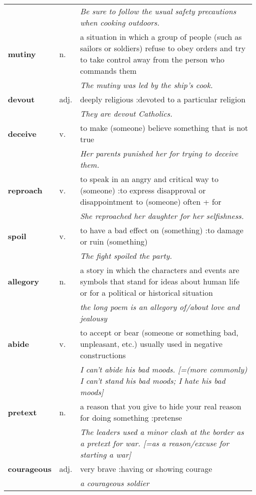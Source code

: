 \documentclass[a4paper]{article}
\begin{document}
\begin{longtable}{llp{11cm}}
 & & \textit{Be sure to follow the usual safety precautions when cooking outdoors.}\\[0.08cm]
\textbf{mutiny} & n. &  a situation in which a group of people (such as sailors or soldiers) refuse to obey orders and try to take control away from the person who commands them \\
 & & \textit{The mutiny was led by the ship's cook.}\\[0.08cm]
\textbf{devout} & adj. &  deeply religious :devoted to a particular religion \\
 & & \textit{They are devout Catholics.}\\[0.08cm]
\textbf{deceive} & v. &  to make (someone) believe something that is not true \\
 & & \textit{Her parents punished her for trying to deceive them.}\\[0.08cm]
\textbf{reproach} & v. &  to speak in an angry and critical way to (someone) :to express disapproval or disappointment to (someone) often + for \\
 & & \textit{She reproached her daughter for her selfishness.}\\[0.08cm]
\textbf{spoil} & v. &  to have a bad effect on (something) :to damage or ruin (something) \\
 & & \textit{The fight spoiled the party.}\\[0.08cm]
\textbf{allegory} & n. &  a story in which the characters and events are symbols that stand for ideas about human life or for a political or historical situation \\
 & & \textit{the long poem is an allegory of/about love and jealousy}\\[0.08cm]
\textbf{abide} & v. &  to accept or bear (someone or something bad, unpleasant, etc.) usually used in negative constructions \\
 & & \textit{I can't abide his bad moods. [=(more commonly) I can't stand his bad moods; I hate his bad moods]}\\[0.08cm]
\textbf{pretext} & n. &  a reason that you give to hide your real reason for doing something :pretense \\
 & & \textit{The leaders used a minor clash at the border as a pretext for war. [=as a reason/excuse for starting a war]}\\[0.08cm]
\textbf{courageous} & adj. &  very brave :having or showing courage \\
 & & \textit{a courageous soldier}\\[0.08cm]

\end{longtable}
\end{document}
